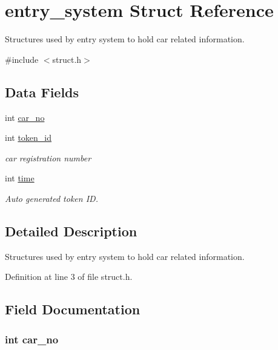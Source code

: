 \hypertarget{structentry__system}{\section{entry\-\_\-system Struct Reference}
\label{structentry__system}
}


Structures used by entry system to hold car related information.  




{\ttfamily \#include $<$struct.\-h$>$}

\subsection*{Data Fields}
\begin{DoxyCompactItemize}
\item 
int \hyperlink{structentry__system_a204e71bb18f92a4e49faff909a5c128a}{car\-\_\-no}
\item 
int \hyperlink{structentry__system_ac10e2e2d66be333d039b75217892053d}{token\-\_\-id}
\begin{DoxyCompactList}\small\item\em car registration number \end{DoxyCompactList}\item 
int \hyperlink{structentry__system_a42715f65f02da52edc5b22021d8ae670}{time}
\begin{DoxyCompactList}\small\item\em Auto generated token I\-D. \end{DoxyCompactList}\end{DoxyCompactItemize}


\subsection{Detailed Description}
Structures used by entry system to hold car related information. 

Definition at line 3 of file struct.\-h.



\subsection{Field Documentation}
\hypertarget{structentry__system_a204e71bb18f92a4e49faff909a5c128a}{
\subsubsection[{car\-\_\-no}]{\setlength{\rightskip}{0pt plus 5cm}int {\bf car\-\_\-no}}}\label{structentry__system_a204e71bb18f92a4e49faff909a5c128a}


